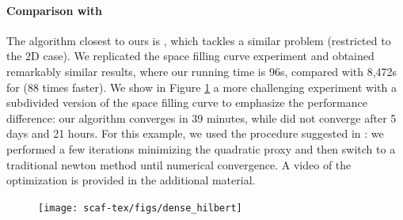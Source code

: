 \paragraph{Comparison with \cite{Smith:2015}}
The algorithm closest to ours is \cite{Smith:2015}, which tackles a similar problem (restricted to the 2D case). We replicated the space filling curve experiment and obtained remarkably similar results, where our running time is 96s, compared with 8,472s for \cite{Smith:2015} (88 times faster). We show in Figure \ref{scaf:fig:smith} a more challenging experiment with a subdivided version of the space filling curve to emphasize the performance difference: our algorithm converges in 39 minutes, while \cite{Smith:2015} did not converge after 5 days and 21 hours. For this example, we used the procedure suggested in \cite{rabinovich2017scalable}: we performed a few iterations minimizing the quadratic proxy and then switch to a traditional newton method until numerical convergence. A video of the optimization is provided in the additional material.

\begin{figure}[t]
\texttt{[image: scaf-tex/figs/dense\_hilbert]}
\caption{}
\label{scaf:fig:smith}
\vspace{-0.2cm}
\end{figure}

